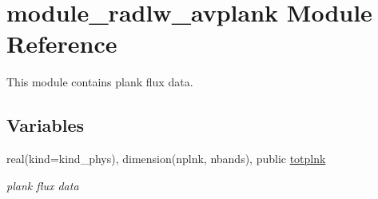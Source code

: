 \hypertarget{namespacemodule__radlw__avplank}{}\section{module\+\_\+radlw\+\_\+avplank Module Reference}
\label{namespacemodule__radlw__avplank}


This module contains plank flux data.  


\subsection*{Variables}
\begin{DoxyCompactItemize}
\item 
\mbox{\label{namespacemodule__radlw__avplank_a40c3d6831ec6d7dbdb31254226c8f861}} 
real(kind=kind\+\_\+phys), dimension(nplnk, nbands), public \hyperlink{namespacemodule__radlw__avplank_a40c3d6831ec6d7dbdb31254226c8f861}{totplnk}
\begin{DoxyCompactList}\small\item\em plank flux data \end{DoxyCompactList}\end{DoxyCompactItemize}
